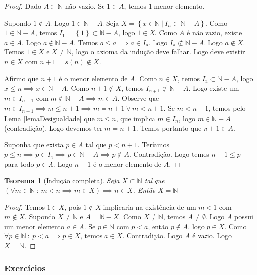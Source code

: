 \documentclass{article}
\theoremstyle{plain}
\newtheorem{teo}{Teorema}
\theoremstyle{definition}
\theoremstyle{remark}
\begin{document}
\begin{proof}
	Dado $A\subset \mathbb{N}$ não vazio. Se $1\in A$, temos $1$ menor elemento.  

	Supondo $1\not \in A$. Logo $1\in \mathbb{N} - A$.  Seja $X = \left\{ x \in \mathbb{N} \: | \:  I_n \subset \mathbb{N} - A \right\}$.   Como $1\in \mathbb{N} - A$, temos $I_1 = \left\{1\right\} \subset \mathbb{N} - A$, logo $1 \in X$.   Como  $A$ é não vazio, existe $a\in A$. Logo $a\not \in \mathbb{N} -A$.  Temos $a\leq a \implies a\in I_a$. Logo $I_a \not \subset \mathbb{N} - A$.   Logo $a \not \in X$. Temos $1 \in X$ e $X\neq \mathbb{N}$, logo o axioma da indução deve falhar. Logo deve existir $n\in X$ com $n+1 = s(n)\not \in X$. 

	Afirmo que $n+1$ é o menor elemento de $A$.  Como $n\in X$, temos $I_n \subset \mathbb{N} - A$, logo $x \leq n \implies x \in \mathbb{N} - A$. Como $n+1\not \in X$, temos $I_{n+1} \not \subset \mathbb{N} - A$.  Logo existe um $m \in I_{n+1}$ com $m\not \in \mathbb{N} - A\implies m  \in A$. Observe que $m\in I_{n+1} \implies m \leq n+1 \implies m = n+1 \lor m<n+1$. Se $m < n+1$, temos pelo Lema \ref{lemaDesigualdade} que $m\leq n$, que implica $m\in I_{n}$, logo $m\in \mathbb{N} - A$ (contradição). Logo devemos ter $m = n+1$. Temos portanto que $n+1\in A$. 


	Suponha que exista $p \in A$ tal que $p < n+1$.  Teríamos $p\leq n \implies p \in I_n \implies p \in \mathbb{N} -A \implies p \not \in A$. Contradição. Logo temos $n+1\leq p$ para todo $p\in A$. Logo $n+1$ é o menor elemento de $A$.
\end{proof}
\begin{teo}[Indução completa]
	Seja $X \subset \mathbb{N}$ tal que $( \forall m \in \mathbb{N} \: : \: m < n \implies m\in X) \implies n \in X $. Então $X = \mathbb{N}$
\end{teo}
\begin{proof}
	Temos $1 \in X$, pois $1\not \in X$ implicaria na existência de um $m < 1$ com $m\not \in X$.    Supondo $X\neq \mathbb{N}$ e $A = \mathbb{N} - X$. Como $X\neq \mathbb{N}$, temos $A \neq \emptyset$. Logo $A$ possui um menor elemento $a\in A$.  Se $p\in \mathbb{N}$ com $p < a $, então $p \not \in A$, logo $p\in X$. Como $ \forall p \in \mathbb{N} \: : \: p < a \implies p \in X$, temos $a \in X$. Contradição. Logo $A$ é vazio. Logo $X = \mathbb{N}$.
\end{proof}

\subsubsection{Exercícios}
\end{document}
